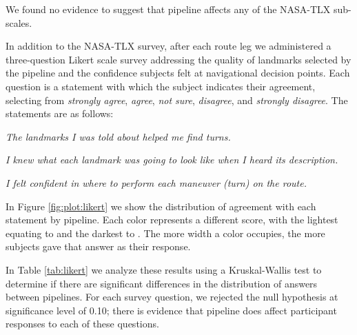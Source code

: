 We found no evidence to suggest that pipeline affects any of the NASA-TLX sub-scales.

In addition to the NASA-TLX survey, after each route leg we administered a three-question Likert scale survey addressing the quality of landmarks selected by the pipeline and the confidence subjects felt at navigational decision points. Each question is a statement with which the subject indicates their agreement, selecting from \textit{strongly agree}, \textit{agree}, \textit{not sure}, \textit{disagree}, and  \textit{strongly disagree}. The statements are as follows:

\textit{The landmarks I was told about helped me find turns.}

\textit{I knew what each landmark was going to look like when I heard its description.}

\textit{I felt confident in where to perform each maneuver (turn) on the route.}

In Figure \ref{fig:plot:likert} we show the distribution of agreement with each statement by pipeline. Each color represents a different score, with the lightest equating to  and the darkest to . The more width a color occupies, the more subjects gave that answer as their response.

In Table \ref{tab:likert} we analyze these results using a Kruskal-Wallis test to determine if there are significant differences in the distribution of answers between pipelines. For each survey question, we rejected the null hypothesis at significance level of 0.10; there is evidence that pipeline does affect participant responses to each of these questions. 

